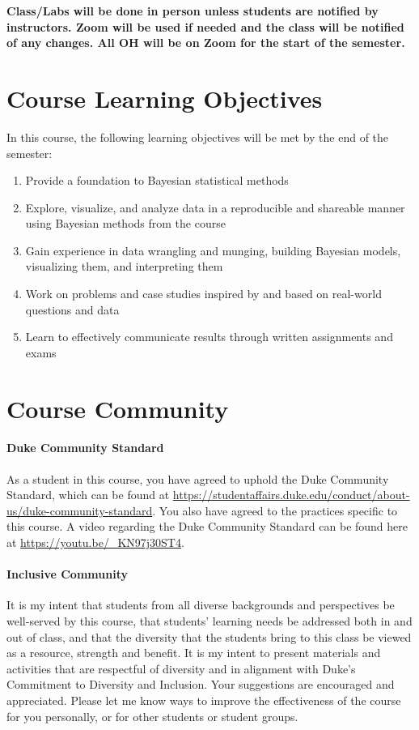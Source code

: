 \documentclass[11pt]{article}
\begin{document}
\textbf{Class/Labs will be done in person unless students are notified by instructors. Zoom will be used if needed and the class will be notified of any changes. All OH will be on Zoom for the start of the semester.}


\section{Course Learning Objectives}
In this course, the following learning objectives will be met by the end of the semester:
\begin{enumerate}
\item Provide a foundation to Bayesian statistical methods
\item Explore, visualize, and analyze data in a reproducible and shareable manner using Bayesian methods from the course
\item Gain experience in data wrangling and munging, building Bayesian models, visualizing them, and interpreting them 
\item Work on problems and case studies inspired by and based on real-world questions and data
\item Learn to effectively communicate results through written assignments and exams 
\end{enumerate}

\section{Course Community}



\paragraph{Duke Community Standard} 
As a student in this course, you have agreed to uphold the Duke Community Standard, which can be found at \url{https://studentaffairs.duke.edu/conduct/about-us/duke-community-standard}. You also have agreed to the practices specific to this course.  A video regarding the Duke Community Standard can be found here at \url{https://youtu.be/_KN97j30ST4}. 


\paragraph{Inclusive Community}

It is my intent that students from all diverse backgrounds and perspectives be well-served by this course, that students’ learning needs be addressed both in and out of class, and that the diversity that the students bring to this class be viewed as a resource, strength and benefit. It is my intent to present materials and activities that are respectful of diversity and in alignment with Duke’s Commitment to Diversity and Inclusion. Your suggestions are encouraged and appreciated. Please let me know ways to improve the effectiveness of the course for you personally, or for other students or student groups. \\
\end{document}
